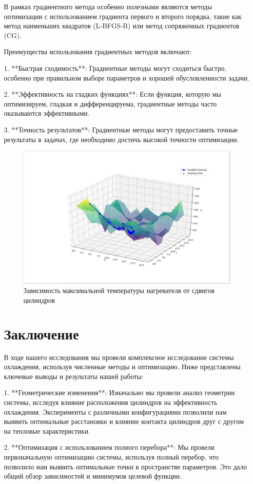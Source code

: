 \documentclass[a4paper,12pt]{article}
\theoremstyle{plain} %
\theoremstyle{definition} %
\theoremstyle{remark} %
\begin{document}
В рамках градиентного метода особенно полезными являются методы оптимизации с использованием градиента первого и второго порядка, такие как метод наименьших квадратов (L-BFGS-B) или метод сопряженных градиентов (CG).

Преимущества использования градиентных методов включают:

1. **Быстрая сходимость**: Градиентные методы могут сходиться быстро, особенно при правильном выборе параметров и хорошей обусловленности задачи.

2. **Эффективность на гладких функциях**: Если функция, которую мы оптимизируем, гладкая и дифференцируема, градиентные методы часто оказываются эффективными.

3. **Точность результатов**: Градиентные методы могут предоставить точные результаты в задачах, где необходимо достичь высокой точности оптимизации.

\begin{figure}[h]
	\begin{center}
		\includegraphics[width=0.4\linewidth]{24.jpg}
		\caption{Зависимость максимальной температуры нагревателя от сдвигов цилиндров} %
	\end{center}
\end{figure}


\newpage
\section{Заключение}

В ходе нашего исследования мы провели комплексное исследование системы охлаждения, используя численные методы и оптимизацию. Ниже представлены ключевые выводы и результаты нашей работы:

1. **Геометрические изменения**: Изначально мы провели анализ геометрии системы, исследуя влияние расположения цилиндров на эффективность охлаждения. Эксперименты с различными конфигурациями позволили нам выявить оптимальные расстановки и влияние контакта цилиндров друг с другом на тепловые характеристики.

2. **Оптимизация с использованием полного перебора**: Мы провели первоначальную оптимизацию системы, используя полный перебор, что позволило нам выявить оптимальные точки в пространстве параметров. Это дало общий обзор зависимостей и минимумов целевой функции.
\end{document}
